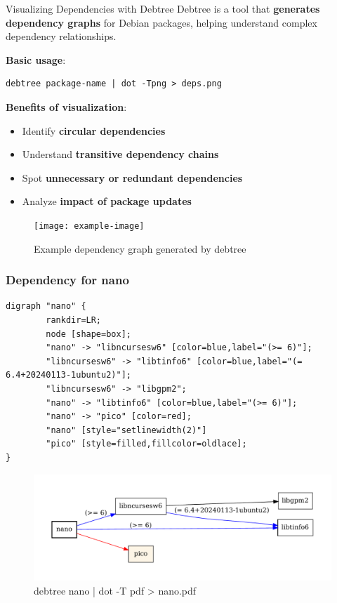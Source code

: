 \documentclass{beamer}
\begin{document}
\begin{frame}[t,fragile]{Visualizing Dependencies with Debtree}
Debtree is a tool that \textbf{generates dependency graphs} for Debian packages, helping understand complex dependency relationships.

\bigskip

\textbf{Basic usage}:
\begin{verbatim}
debtree package-name | dot -Tpng > deps.png
\end{verbatim}

\bigskip

\textbf{Benefits of visualization}:
\begin{itemize}
\item Identify \textbf{circular dependencies}
\item Understand \textbf{transitive dependency chains}
\item Spot \textbf{unnecessary or redundant dependencies}
\item Analyze \textbf{impact of package updates}
\end{itemize}

\begin{figure}
\centering
\texttt{[image: example-image]}
\caption{Example dependency graph generated by debtree}
\end{figure}
\end{frame}

\begin{frame}[t,fragile]
    \frametitle{Dependency for nano}

    \tiny
    \begin{verbatim}
digraph "nano" {
        rankdir=LR;
        node [shape=box];
        "nano" -> "libncursesw6" [color=blue,label="(>= 6)"];
        "libncursesw6" -> "libtinfo6" [color=blue,label="(= 6.4+20240113-1ubuntu2)"];
        "libncursesw6" -> "libgpm2";
        "nano" -> "libtinfo6" [color=blue,label="(>= 6)"];
        "nano" -> "pico" [color=red];
        "nano" [style="setlinewidth(2)"]
        "pico" [style=filled,fillcolor=oldlace];
}
\end{verbatim}
    
    \begin{figure}
    \begin{center}
        \includegraphics[width=.5\textwidth]{images/nano.pdf}
    \end{center}
    \caption{debtree nano | dot -T pdf > nano.pdf}
    \end{figure}
    
\end{frame}
\end{document}
